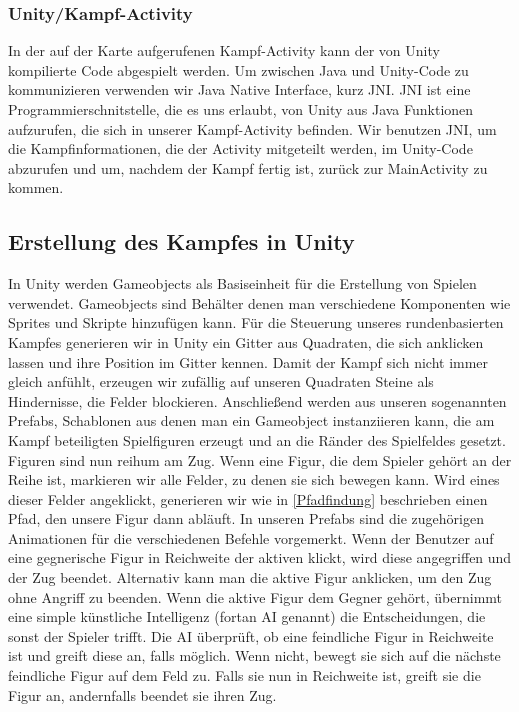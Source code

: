 \documentclass[extern,palatino]{cgBA}
\begin{document}
\subsubsection{Unity/Kampf-Activity}
In der auf der Karte aufgerufenen Kampf-Activity kann der von Unity kompilierte Code abgespielt werden. Um zwischen Java und Unity-Code zu kommunizieren verwenden wir Java Native Interface, kurz JNI. JNI ist eine Programmierschnitstelle, die es uns erlaubt, von Unity aus Java Funktionen aufzurufen, die sich in unserer Kampf-Activity befinden. Wir benutzen JNI, um die Kampfinformationen, die der Activity mitgeteilt werden, im Unity-Code abzurufen und um, nachdem der Kampf fertig ist, zurück zur MainActivity zu kommen.
\newpage
\subsection{Erstellung des Kampfes in Unity}
In Unity werden Gameobjects als Basiseinheit für die Erstellung von Spielen verwendet. Gameobjects sind Behälter denen man verschiedene Komponenten wie Sprites und Skripte hinzufügen kann.%
Für die Steuerung unseres rundenbasierten Kampfes generieren wir in Unity ein Gitter aus Quadraten, die sich anklicken lassen und ihre Position im Gitter kennen. Damit der Kampf sich nicht immer gleich anfühlt, erzeugen wir zufällig auf unseren Quadraten Steine als Hindernisse, die Felder blockieren. Anschließend werden aus unseren sogenannten Prefabs, Schablonen aus denen man ein Gameobject instanziieren kann, die am Kampf beteiligten Spielfiguren erzeugt und an die Ränder des Spielfeldes gesetzt. Figuren sind nun reihum am Zug. Wenn eine Figur, die dem Spieler gehört an der Reihe ist, markieren wir alle Felder, zu denen sie sich bewegen kann. Wird eines dieser Felder angeklickt, generieren wir wie in \ref{Pfadfindung} beschrieben einen Pfad, den unsere Figur dann abläuft. In unseren Prefabs sind die zugehörigen Animationen für die verschiedenen Befehle vorgemerkt. Wenn der Benutzer auf eine gegnerische Figur in Reichweite der aktiven klickt, wird diese angegriffen und der Zug beendet. Alternativ kann man die aktive Figur anklicken, um den Zug ohne Angriff zu beenden. Wenn die aktive Figur dem Gegner gehört, übernimmt eine simple künstliche Intelligenz (fortan AI genannt) die Entscheidungen, die sonst der Spieler trifft. Die AI überprüft, ob eine feindliche Figur in Reichweite ist und greift diese an, falls möglich. Wenn nicht, bewegt sie sich auf die nächste feindliche Figur auf dem Feld zu. Falls sie nun in Reichweite ist, greift sie die Figur an, andernfalls beendet sie ihren Zug.
\end{document}
